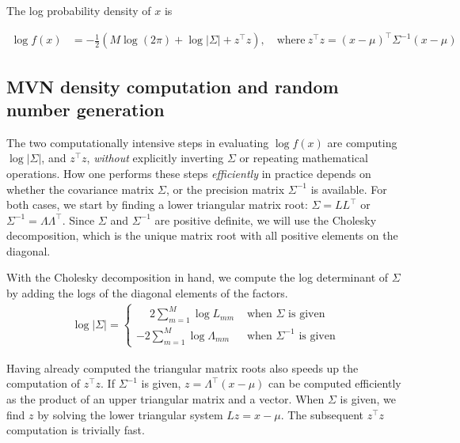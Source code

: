 \documentclass[codesnippet,nojss]{jss}\usepackage[]{graphicx}\usepackage[]{color}
\begin{document}
The log probability density of $x$ is

\begin{align}
\log f(x)&=-\frac{1}{2}\left(M \log (2\pi) + \log|\Sigma|
  +z^\top z\right),\quad\text{where}~z^\top z=\left(x-\mu\right)^\top\Sigma^{-1}\left(x-\mu\right)
 \end{align}

\subsection{MVN density computation and random number generation}\label{sec:algorithms}

The two computationally intensive steps in evaluating $\log f(x)$ are
computing $\log|\Sigma|$, and $z^\top z$, \emph{without} explicitly
inverting $\Sigma$ or repeating mathematical operations.  How one
performs these steps \emph{efficiently} in practice depends on whether the
covariance matrix $\Sigma$, or the precision matrix $\Sigma^{-1}$ is
available. For both cases, we start by finding a lower triangular matrix root:
$\Sigma=LL^\top$ or $\Sigma^{-1}=\Lambda\Lambda^\top$.  Since $\Sigma$
and $\Sigma^{-1}$ are positive definite, we will use the Cholesky
decomposition, which is the unique matrix root with all positive
elements on the diagonal.

With the Cholesky decomposition in hand, we compute the log
determinant of $\Sigma$ by adding the logs of the diagonal elements of
the factors.
\begin{align}
  \label{eq:logDet}
  \log|\Sigma|= \begin{cases}
    \phantom{-}2\sum_{m=1}^M\log L_{mm}&\text{ when $\Sigma$ is given}\\
    -2\sum_{m=1}^M\log \Lambda_{mm}&\text{ when $\Sigma^{-1}$ is given}
    \end{cases}
\end{align}

Having already computed the triangular matrix roots also speeds up the computation of
$z^\top z$.  If $\Sigma^{-1}$ is given, $z=\Lambda^\top(x-\mu)$ can be computed
efficiently as the product of an upper triangular matrix and a
vector. When $\Sigma$ is given, we find $z$ by solving the lower
triangular system $Lz=x-\mu$.  The subsequent $z^\top z$
computation is trivially fast.
\end{document}
